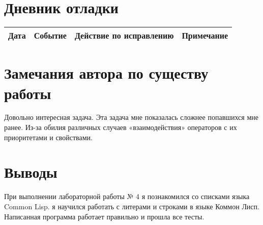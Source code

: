 \documentclass[12pt]{article}
\begin{document}
\pagebreak
\section{Дневник отладки}
\begin{tabular}{|p{50pt}|p{80pt}|p{140pt}|p{140pt}|}
\hline
Дата & Событие & Действие по исправлению & Примечание \\
\hline
\end{tabular}

\section{Замечания автора по существу работы}
Довольно интересная задача. Эта задача мне показалась сложнее попавшихся мне ранее. Из-за обилия различных случаев «взаимодействия» операторов с их приоритетами и свойствами.


\section{Выводы}
При выполнении лабораторной работы № 4 я познакомился со списками языка Common Lisp. я научился работать с литерами и строками в языке Коммон Лисп. Написанная программа работает правильно и прошла все тесты.
\end{document}

